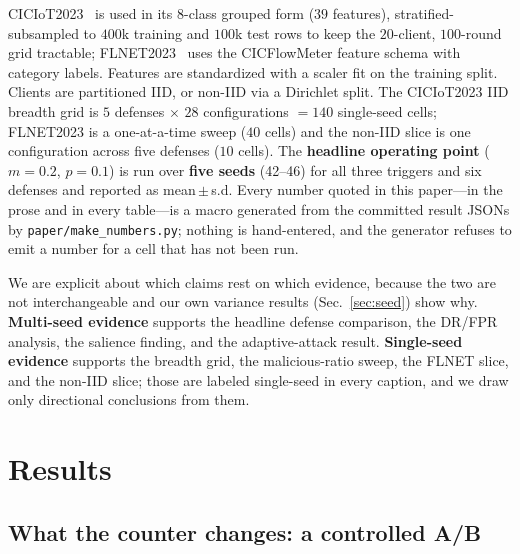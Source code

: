 CICIoT2023~\cite{neto2023ciciot} is used in its 8-class grouped form ($39$
features), stratified-subsampled to $400$k training and $100$k test rows to keep
the $20$-client, $100$-round grid tractable; FLNET2023~\cite{flnet2023} uses the
CICFlowMeter feature schema with category labels. Features are standardized with
a scaler fit on the training split. Clients are partitioned IID, or non-IID via a
Dirichlet split. The CICIoT2023 IID breadth grid is $5$ defenses $\times$
$28$ configurations $=140$ single-seed cells; FLNET2023 is a one-at-a-time sweep
($40$ cells) and the non-IID slice is one configuration across five defenses
($10$ cells). The \textbf{headline operating point} ($m{=}0.2$, $p{=}0.1$) is run
over \textbf{five seeds} (42--46) for all three triggers and six defenses and
reported as mean\,$\pm$\,s.d. Every number quoted in this paper---in the prose and in
every table---is a macro generated from the committed result JSONs by
\texttt{paper/make\_numbers.py}; nothing is hand-entered, and the generator
refuses to emit a number for a cell that has not been run.

We are explicit about which claims rest on which evidence, because the two are
not interchangeable and our own variance results (Sec.~\ref{sec:seed}) show why.
\textbf{Multi-seed evidence} supports the headline defense comparison, the
DR/FPR analysis, the salience finding, and the adaptive-attack result.
\textbf{Single-seed evidence} supports the breadth grid, the malicious-ratio
sweep, the FLNET slice, and the non-IID slice; those are labeled single-seed in
every caption, and we draw only directional conclusions from them.

\section{Results}

\subsection{What the counter changes: a controlled A/B}
\label{sec:p1}

